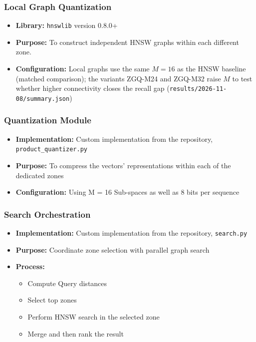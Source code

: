 \documentclass[conference]{IEEEtran}
\begin{document}
\subsubsection{Local Graph Quantization}
\begin{itemize}
    \item \textbf{Library:} \texttt{hnswlib} version 0.8.0+
    \item \textbf{Purpose:} To construct independent HNSW graphs within each different zone.
    \item \textbf{Configuration:} Local graphs use the same $M=16$ as the HNSW baseline (matched comparison); the variants ZGQ-M24 and ZGQ-M32 raise $M$ to test whether higher connectivity closes the recall gap (\texttt{results/2026-11-08/summary.json})
\end{itemize}

\subsubsection{Quantization Module}
\begin{itemize}
    \item \textbf{Implementation:} Custom implementation from the repository, \texttt{product\_quantizer.py}
    \item \textbf{Purpose:} To compress the vectors’ representations within each of the dedicated zones
    \item \textbf{Configuration:} Using M = 16 Sub-spaces as well as 8 bits per sequence
\end{itemize}

\subsubsection{Search Orchestration}
\begin{itemize}
    \item \textbf{Implementation:} Custom implementation from the repository, \texttt{search.py}
    \item \textbf{Purpose:} Coordinate zone selection with parallel graph search
    \item \textbf{Process:}
    \begin{itemize}
        \item[i.] Compute Query distances
        \item[ii.] Select top zones
        \item[iii.] Perform HNSW search in the selected zone
        \item[iv.] Merge and then rank the result
    \end{itemize}
\end{itemize}
\end{document}

